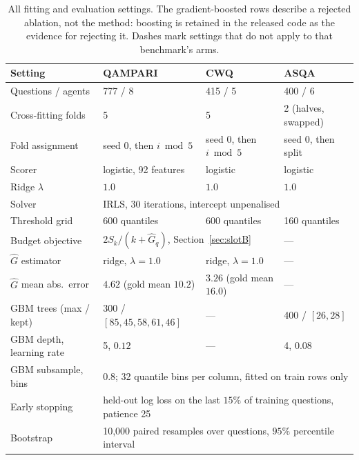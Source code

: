 \documentclass{article}
\begin{document}
\begin{table}
  \caption{All fitting and evaluation settings. The gradient-boosted rows describe a rejected ablation, not the method: boosting is retained in the released code as the evidence for rejecting it. Dashes mark settings that do not apply to that benchmark's arms.}
  \label{tab:hyper}
  \centering
  \begin{tabular}{llll}
    \toprule
    Setting & QAMPARI & CWQ & ASQA \\
    \midrule
    Questions / agents          & 777 / 8 & 415 / 5 & 400 / 6 \\
    Cross-fitting folds         & 5 & 5 & 2 (halves, swapped) \\
    Fold assignment             & seed 0, then $i \bmod 5$ & seed 0, then $i \bmod 5$ & seed 0, then split \\
    \midrule
    Scorer                      & logistic, 92 features & logistic & logistic \\
    Ridge $\lambda$             & $1.0$ & $1.0$ & $1.0$ \\
    Solver                      & \multicolumn{3}{l}{IRLS, 30 iterations, intercept unpenalised} \\
    Threshold grid              & 600 quantiles & 600 quantiles & 160 quantiles \\
    \midrule
    Budget objective            & \multicolumn{2}{l}{$2S_k / (k + \hat{G}_q)$, Section~\ref{sec:slotB}} & --- \\
    $\hat{G}$ estimator         & ridge, $\lambda = 1.0$ & ridge, $\lambda = 1.0$ & --- \\
    $\hat{G}$ mean abs.\ error  & $4.62$ (gold mean $10.2$) & $3.26$ (gold mean $16.0$) & --- \\
    \midrule
    GBM trees (max / kept)      & 300 / $[85, 45, 58, 61, 46]$ & --- & 400 / $[26, 28]$ \\
    GBM depth, learning rate    & 5, $0.12$ & --- & 4, $0.08$ \\
    GBM subsample, bins         & \multicolumn{3}{l}{$0.8$; 32 quantile bins per column, fitted on train rows only} \\
    Early stopping              & \multicolumn{3}{l}{held-out log loss on the last $15\%$ of training questions, patience 25} \\
    \midrule
    Bootstrap                   & \multicolumn{3}{l}{10,000 paired resamples over questions, $95\%$ percentile interval} \\
    \bottomrule
  \end{tabular}
\end{table}
\end{document}
